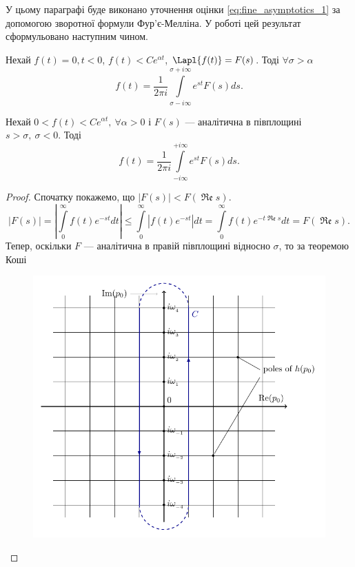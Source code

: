 У цьому параграфі буде виконано уточнення оцінки \eqref{eq:fine_asymptotics_1} за допомогою зворотної формули Фур'є-Мелліна. У роботі \cite{schiff1999laplace} цей результат сформульовано наступним чином.
\begin{thm}
\label{eq:mellin_thm}
Нехай $f(t) = 0, t < 0$,  $f(t) < Ce^{\alpha t}$, $\Lapl{f(t)} = F(s)$. Тоді $\forall \sigma > \alpha$
\begin{equation}
f(t) = \frac{1}{2\pi i}\int\limits_{\sigma - i\infty}^{\sigma + i\infty} e^{st} F(s) ds.
\end{equation}
\end{thm}
\begin{corollary}
\label{eq:mellin_analytic}
Нехай $0 < f(t) < Ce^{\alpha t}, ~ \forall \alpha > 0$ і $F(s)$ --- аналітична в півплощині $s > \sigma, ~\sigma < 0$. Тоді
\begin{equation}
f(t) = \frac{1}{2\pi i}\int\limits_{- i\infty}^{+ i\infty} e^{st} F(s) ds.
\end{equation}
\begin{proof}
Спочатку покажемо, що $|F(s)| < F(\operatorname{\mathfrak{Re}} s)$.
\begin{equation*}
|F(s)| = \left| \int\limits_{0}^{\infty}  f(t) e^{-st} dt \right| \leq \int\limits_{0}^{\infty} \left|f(t) e^{-st} \right| dt = \int\limits_{0}^{\infty} f(t)  e^{-t\operatorname{\mathfrak{Re}} s}  dt = F(\operatorname{\mathfrak{Re}} s).
\end{equation*}
Тепер, оскільки $F$ --- аналітична в правій півплощині відносно $\sigma$, то за теоремою Коші \cite{lavrentiev1965}
\begin{figure}[h]
	\centering
	\includegraphics{chapter_Asymptotics/img/figure1}

\end{figure}
\end{proof}
\end{corollary}
